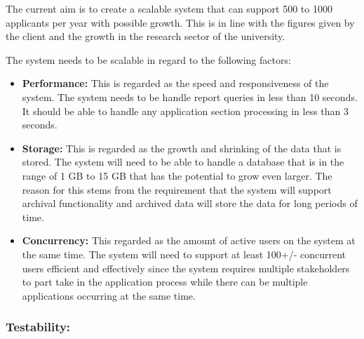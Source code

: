 \documentclass[12pt]{article}
\begin{document}
		\begin{flushleft}
		
		The current aim is to create a scalable system that can support 500 to 1000 applicants per year with possible growth. This is in line with the figures given by the client and the growth in the research sector of the university.\\
		\vspace{0.05in}
		
		The system needs to be scalable in regard to the following factors:
		\begin{itemize}
		
		
		\item\textbf{Performance:} This is regarded as the speed and responsiveness of the system.		
		The system needs to be handle report queries in less than 10 seconds. It should be able to handle any application section processing in less than 3 seconds.\\
		
		\item\textbf{Storage:} This is regarded as the growth and shrinking of the data that is stored.
		The system will need to be able to handle a database that is in the range of 1 GB to 15 GB that has the potential to grow even larger.  The reason for this stems from the requirement that the system will support archival functionality and archived data will store the data for long periods of time.\\
		 
		\item\textbf{Concurrency:} This regarded as the amount of active users on the system at the same time.		
		The system will need to support at least 100+/- concurrent users efficient and effectively since the system requires multiple stakeholders to part take in the application process while there can be multiple applications occurring at the same time.\\ 
		 
		\end{itemize}
		\end{flushleft}
		\vspace{0.1in}
		
		\subsubsection{Testability:}
				
\end{document}
